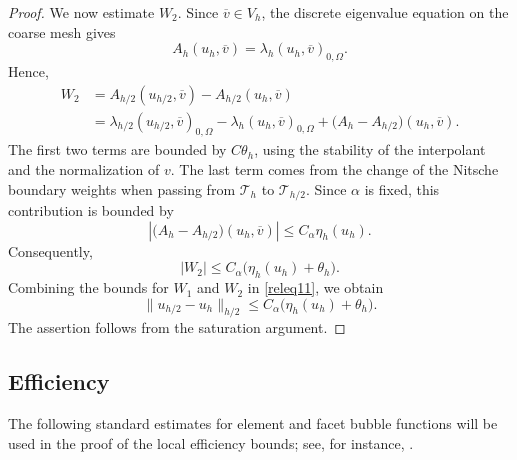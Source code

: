 \documentclass[onefignum,onetabnum,final]{siamart250211}
\numberwithin{equation}{section}
\newcommand\0{\boldsymbol{0}}
\begin{document}
\begin{proof}
We now estimate $W_2$. Since $\overline{v}\in V_h$, the discrete eigenvalue equation
on the coarse mesh gives
\[
   A_h(u_h,\overline{v}) = \lambda_h(u_h,\overline{v})_{0,\Omega}.
\]
Hence,
\begin{align*}
W_2 &= A_{h/2}(u_{h/2},\overline{v}) - A_{h/2}(u_h,\overline{v}) \\
&=\lambda_{h/2}(u_{h/2},\overline{v})_{0,\Omega} - \lambda_h(u_h,\overline{v})_{0,\Omega} + \big(A_h-A_{h/2}\big)(u_h,\overline{v}).
\end{align*}
The first two terms are bounded by $C\theta_h$, using the stability of the interpolant
and the normalization of $v$. The last term comes from the change of the Nitsche boundary
weights when passing from $\mathcal T_h$ to $\mathcal T_{h/2}$. Since $\alpha$ is fixed,
this contribution is bounded by
\[
   \left|\big(A_h-A_{h/2}\big)(u_h,\overline{v})\right| \leq  C_\alpha \eta_h(u_h).
\]
Consequently,
\[
   |W_2| \leq C_\alpha\big(\eta_h(u_h)+\theta_h\big).
\]
Combining the bounds for $W_1$ and $W_2$ in \eqref{releq11}, we obtain
\[
   \|u_{h/2}-u_h\|_{h/2} \leq C_\alpha\big(\eta_h(u_h)+\theta_h\big).
\]
The assertion follows from the saturation argument.
\end{proof}
		\subsection{Efficiency}
The following standard estimates for element and facet bubble functions will be used in the proof of the local efficiency bounds; see, for instance, \cite{MR1885308,MR3059294}.
\end{document}
